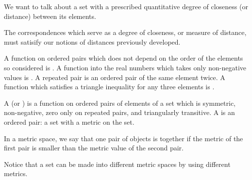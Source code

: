 
\sbasic















\sstart
{}


We want to talk about a set
with a prescribed quantitative
degree of closeness (or distance)
between its elements.


The correspondences
which serve as a
degree of closeness,
or measure of distance, must
satisify our notions of distances
previously developed.

A function on ordered pairs which
does not depend on the order of
the elements so considered is
.
A function into the real numbers
which takes only non-negative
values is .
A repeated pair is an ordered pair
of the same element twice.
A function which satisfies
a triangle inequality for any
three elements is
.

A 
(or )
is a function
on ordered pairs of elements
of a set which
is symmetric, non-negative,
zero only on repeated pairs,
and triangularly
transitive.
A 
is an ordered
pair: a set with
a metric on the set.

In a metric space,
we say that one pair
of objects is 
together if
the metric
of the first pair
is smaller than the
metric value of the
second pair.

Notice that a set can be made into
different metric spaces by using
different metrics.


